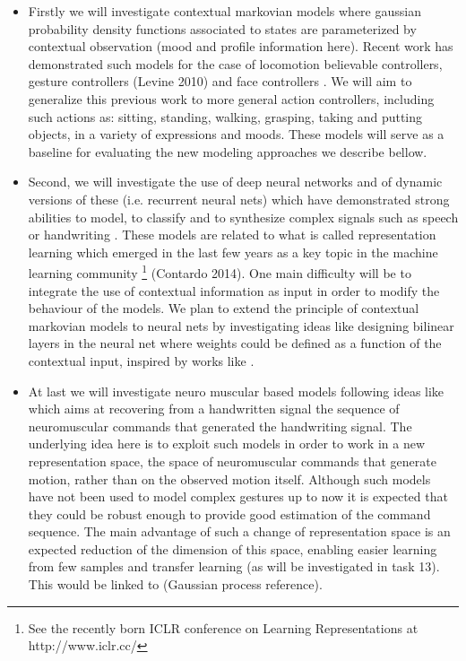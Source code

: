 \begin{itemize}  
  \item Firstly we will investigate contextual markovian models where gaussian probability density functions associated to states are parameterized by contextual observation (mood and profile information here). Recent work has demonstrated such models for the case of locomotion believable controllers, gesture controllers (Levine 2010) and face controllers \cite{Ding2013, Ding2014}. We will aim to generalize this previous work to more general action controllers, including such actions as: sitting, standing, walking, grasping, taking and putting objects, in a variety of expressions and moods. These models will serve as a baseline for evaluating the new modeling approaches we describe bellow. 
  \item Second, we will investigate the use of deep neural networks and of dynamic versions of these (i.e. recurrent neural nets) which have demonstrated strong abilities to model, to classify and to synthesize complex signals such as speech or handwriting \cite{HintonDeepSpeech, Deng_Speech_Reco, GravesHWR_Reco, GravesHWR_Synth}. These models are related to what is called representation learning which emerged in the last few years as a key topic in the machine learning community \footnote{See the recently born ICLR conference on Learning Representations at http://www.iclr.cc/} (Contardo 2014). One main difficulty will be to integrate the use of contextual information as input in order to modify the behaviour of the models. We plan to extend the principle of contextual markovian models to neural nets by investigating ideas like designing bilinear layers in the neural net where weights could be defined as a function of the contextual input, inspired by works like \cite{Bilinear, Multiview}.
  \item At last we will investigate neuro muscular based models following ideas like \cite{O'Reilly et al., 2012} which aims at recovering from a handwritten signal the sequence of neuromuscular commands that generated the handwriting signal. The underlying idea here is to exploit such models in order to work in a new representation space, the space of neuromuscular commands that generate motion, rather than on the observed motion itself. Although such models have not been used to model complex gestures up to now it is expected that they could be robust enough to provide good estimation of the command sequence. The main advantage of such a change of representation space is an expected reduction of the dimension of this space, enabling easier learning from few samples and transfer learning (as will be investigated in task 13). This would be linked to (Gaussian process reference).

\end{itemize}

